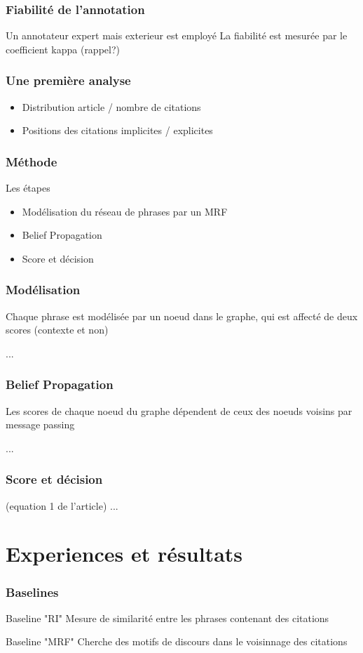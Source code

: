 \documentclass[12pt]{beamer}
\begin{document}
\begin{frame}
  \frametitle{Fiabilité de l'annotation}
  Un annotateur expert mais exterieur est employé
  La fiabilité est mesurée par le coefficient kappa (rappel?)
\end{frame}

\begin{frame}
  \frametitle{Une première analyse}
  \begin{itemize}
    \item Distribution article / nombre de citations
    \item Positions des citations implicites / explicites
  \end{itemize}
\end{frame}

\begin{frame}
  \frametitle{Méthode}
  Les étapes
  \begin{itemize}
    \item Modélisation du réseau de phrases par un MRF
    \item Belief Propagation
    \item Score et décision
  \end{itemize}
\end{frame}

\begin{frame}
  \frametitle{Modélisation}
  Chaque phrase est modélisée par un noeud dans le graphe, qui est affecté de deux scores (contexte et non)

  ...
\end{frame}

\begin{frame}
  \frametitle{Belief Propagation}
  Les scores de chaque noeud du graphe dépendent de ceux des noeuds voisins par message passing

  ...
\end{frame}

\begin{frame}
  \frametitle{Score et décision}
  (equation 1 de l'article)
  ...
\end{frame}

\section{Experiences et résultats}
\begin{frame}
  \frametitle{Baselines}
  \begin{block}{Baseline "RI"}
    Mesure de similarité entre les phrases contenant des citations
  \end{block}
  \begin{block}{Baseline "MRF"}
    Cherche des motifs de discours dans le voisinnage des citations 
  \end{block}
\end{frame}
\end{document}
